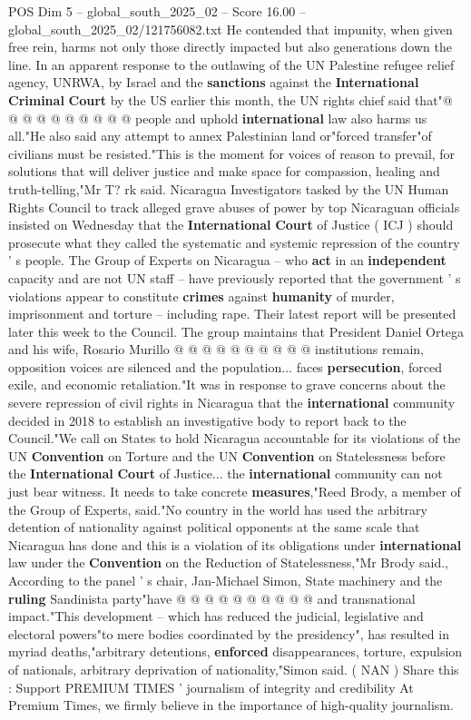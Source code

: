 \begin{textsample}{POS Dim 5 – global\_south\_2025\_02 – Score 16.00 – global\_south\_2025\_02/121756082.txt}
He contended that impunity, when given free rein, harms not only those directly impacted but also generations down the line.
In an apparent response to the outlawing of the UN Palestine refugee relief agency, UNRWA, by Israel and the \textbf{sanctions} against the \textbf{International} \textbf{Criminal} \textbf{Court} by the US earlier this month, the UN rights chief said that"@ @ @ @ @ @ @ @ @ @ people and uphold \textbf{international} law also harms us all."He also said any attempt to annex Palestinian land or"forced transfer"of civilians must be resisted."This is the moment for voices of reason to prevail, for solutions that will deliver justice and make space for compassion, healing and truth-telling,"Mr T? rk said.
Nicaragua Investigators tasked by the UN Human Rights Council to track alleged grave abuses of power by top Nicaraguan officials insisted on Wednesday that the \textbf{International} \textbf{Court} of Justice ( ICJ ) should prosecute what they called the systematic and systemic repression of the country ' s people.
The Group of Experts on Nicaragua -- who \textbf{act} in an \textbf{independent} capacity and are not UN staff -- have previously reported that the government ' s violations appear to constitute \textbf{crimes} against \textbf{humanity} of murder, imprisonment and torture -- including rape.
Their latest report will be presented later this week to the Council.
The group maintains that President Daniel Ortega and his wife, Rosario Murillo @ @ @ @ @ @ @ @ @ @ institutions remain, opposition voices are silenced and the population... faces \textbf{persecution}, forced exile, and economic retaliation."It was in response to grave concerns about the severe repression of civil rights in Nicaragua that the \textbf{international} community decided in 2018 to establish an investigative body to report back to the Council."We call on States to hold Nicaragua accountable for its violations of the UN \textbf{Convention} on Torture and the UN \textbf{Convention} on Statelessness before the \textbf{International} \textbf{Court} of Justice... the \textbf{international} community can not just bear witness.
It needs to take concrete \textbf{measures},"Reed Brody, a member of the Group of Experts, said."No country in the world has used the arbitrary detention of nationality against political opponents at the same scale that Nicaragua has done and this is a violation of its obligations under \textbf{international} law under the \textbf{Convention} on the Reduction of Statelessness,"Mr Brody said., According to the panel ' s chair, Jan-Michael Simon, State machinery and the \textbf{ruling} Sandinista party"have @ @ @ @ @ @ @ @ @ @ and transnational impact."This development -- which has reduced the judicial, legislative and electoral powers"to mere bodies coordinated by the presidency", has resulted in myriad deaths,"arbitrary detentions, \textbf{enforced} disappearances, torture, expulsion of nationals, arbitrary deprivation of nationality,"Simon said. ( NAN ) Share this : Support PREMIUM TIMES ' journalism of integrity and credibility At Premium Times, we firmly believe in the importance of high-quality journalism.

\end{textsample}
